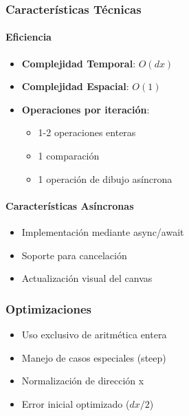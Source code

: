 \documentclass[12pt]{article}
\begin{document}
\subsubsection{Características Técnicas}
\paragraph{Eficiencia}
\begin{itemize}
    \item \textbf{Complejidad Temporal}: $O(dx)$
    \item \textbf{Complejidad Espacial}: $O(1)$
    \item \textbf{Operaciones por iteración}:
    \begin{itemize}
        \item 1-2 operaciones enteras
        \item 1 comparación
        \item 1 operación de dibujo asíncrona
    \end{itemize}
\end{itemize}

\paragraph{Características Asíncronas}
\begin{itemize}
    \item Implementación mediante async/await
    \item Soporte para cancelación
    \item Actualización visual del canvas
\end{itemize}

\subsubsection{Optimizaciones}
\begin{itemize}
    \item Uso exclusivo de aritmética entera
    \item Manejo de casos especiales (steep)
    \item Normalización de dirección x
    \item Error inicial optimizado ($dx/2$)
\end{itemize}
\end{document}
